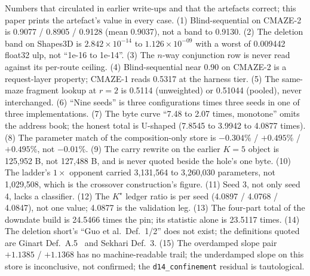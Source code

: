 \documentclass{article} %
\newcommand{\sci}[2]{\ensuremath{#1\times10^{#2}}}
\newcommand{\Kstar}{\ensuremath{K^{\star}}}
\begin{document}
Numbers that circulated in earlier write-ups and that the artefacts correct; this paper prints the
artefact's value in every case. %
(1) Blind-sequential on CMAZE-2 is 0.9077 / 0.8905 / 0.9128 (mean 0.9037), not a band to 0.9130.
(2) The deletion band on Shapes3D is \sci{2.842}{-14} to \sci{1.126}{-09} with a worst of 0.009442
float32 ulp, not ``1e-16 to 1e-14''. (3) The $n$-way conjunction row is never read against its
per-route ceiling. (4) Blind-sequential near 0.90 on CMAZE-2 is a request-layer property; CMAZE-1
reads 0.5317 at the harness tier. (5) The same-maze fragment lookup at $r=2$ is 0.5114 (unweighted)
or 0.51044 (pooled), never interchanged. (6) ``Nine seeds'' is three configurations times three seeds
in one of three implementations. (7) The byte curve ``7.48 to 2.07 times, monotone'' omits the
address book; the honest total is U-shaped (7.8545 to 3.9942 to 4.0877 times). (8) The parameter
match of the composition-only store is $-0.304$\% / $+0.495$\% / $+0.495$\%, not $-0.01$\%. (9) The
carry rewrite on the earlier $K=5$ object is 125,952 B, not 127,488 B, and is never quoted beside the
hole's one byte. (10) The ladder's $1\times$ opponent carried 3,131,564 to 3,260,030 parameters, not
1,029,508, which is the crossover construction's figure. (11) Seed 3, not only seed 4, lacks a
classifier. (12) The $\Kstar$ ledger ratio is per seed (4.0897 / 4.0768 / 4.0847), not one value;
4.0877 is the validation leg. (13) The four-part total of the downdate build is 24.5466 times the pin;
its statistic alone is 23.5117 times. (14) The deletion short's ``Guo et al.\ Def.~1/2'' does not
exist; the definitions quoted are Ginart Def.~A.5~\citep{ginart2019making} and Sekhari Def.~3. %
(15) The overdamped slope pair $+1.1385$ / $+1.1368$ has no machine-readable trail; the underdamped %
slope on this store is inconclusive, not confirmed; the \texttt{d14\_confinement} residual is
tautological.
\end{document}
